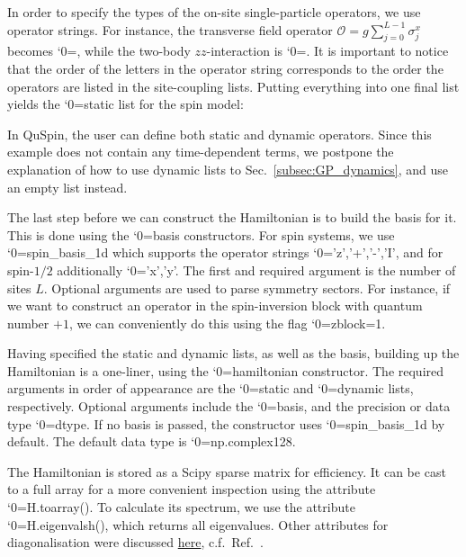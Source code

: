 \documentclass{SciPost}
\newcommand\0{\scalebox{-1}[1]{0}}
\let\svttfamily\ttfamily
\renewcommand\ttfamily{\svttfamily\catcode`0=\active }
\renewcommand\texttt{\bgroup\ttfamily\texttthelp}
\def\texttthelp#1{#1\egroup}
\newcommand{\JWcode}{example4.py}
\begin{document}
In order to specify the types of the on-site single-particle operators, we use operator strings. For instance, the transverse field operator $\mathcal{O}=g\sum_{j=0}^{L-1}\sigma^x_j$ becomes \texttt{['x',h\_field]}, while the two-body $zz$-interaction is \texttt{['zz',J\_zz]}. It is important to notice that the order of the letters in the operator string corresponds to the order the operators are listed in the site-coupling lists. Putting everything into one final list yields the \texttt{static} list for the spin model:  

In QuSpin, the user can define both static and dynamic operators. Since this example does not contain any time-dependent terms, we postpone the explanation of how to use dynamic lists to Sec.~\ref{subsec:GP_dynamics}, and use an empty list instead.

The last step before we can construct the Hamiltonian is to build the basis for it. This is done using the \texttt{basis} constructors. For spin systems, we use \texttt{spin\_basis\_1d} which supports the operator strings \texttt{'z','+','-','I'}, and for spin-$1/2$ additionally \texttt{'x','y'}. The first and required argument is the number of sites $L$. Optional arguments are used to parse symmetry sectors. For instance, if we want to construct an operator in the spin-inversion block with quantum number $+1$, we can conveniently do this using the flag \texttt{zblock=1}.

Having specified the static and dynamic lists, as well as the basis, building up the Hamiltonian is a one-liner, using the \texttt{hamiltonian} constructor. The required arguments in order of appearance are the \texttt{static} and \texttt{dynamic} lists, respectively. Optional arguments include the \texttt{basis}, and the precision or data type \texttt{dtype}. If no basis is passed, the constructor uses \texttt{spin\_basis\_1d} by default. The default data type is \texttt{np.complex128}.
 
The Hamiltonian is stored as a Scipy sparse matrix for efficiency. It can be cast to a full array for a more convenient inspection using the attribute \texttt{H.toarray()}. To calculate its spectrum, we use the attribute \texttt{H.eigenvalsh()}, which returns all eigenvalues. Other attributes for diagonalisation were discussed \href{http://weinbe58.github.io/QuSpin/examples/example0.html#example0-label}{here}, c.f.~Ref.~\cite{weinberg_17_quspin}.
 
\end{document}
